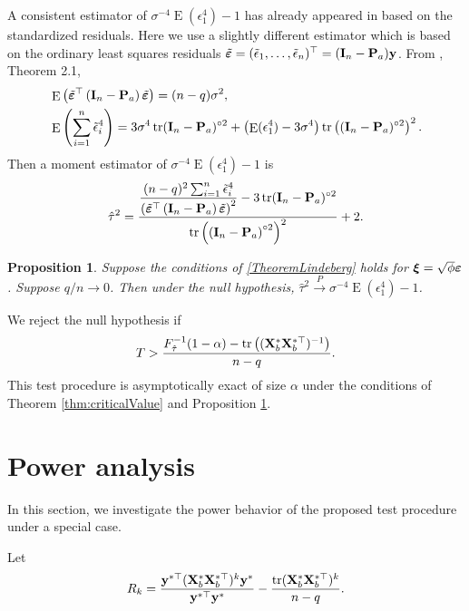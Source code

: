 \documentclass[11pt]{article}
\DeclareMathOperator{\mytr}{tr}
\DeclareMathOperator{\myE}{E}
\newcommand{\By}{\mathbf{y}}    \newcommand{\Bz}{\mathbf{z}}
\newcommand{\bfsym}[1]{\ensuremath{\boldsymbol{#1}}}
\def\bxi{\bfsym {\xi}}
\theoremstyle{plain}
\newtheorem{proposition}{\quad\quad Proposition}
\theoremstyle{definition}
\theoremstyle{remark}
\begin{document}
        A consistent estimator of $\sigma^{-4} \myE (\epsilon_1^4)-1$ has already appeared in \cite{Bai2017} based on the standardized residuals.
        Here we use a slightly different estimator which is based on the ordinary least squares residuals $\tilde \bepsilon=(\tilde \epsilon_1,\ldots, \tilde \epsilon_n)^\top=(\BI_n - \BP_a) \By$.
    From \cite{Bai2017}, Theorem 2.1, 
    \begin{align*}
        &\myE \left( \tilde \bepsilon^\top \left( \BI_n-\BP_a \right) \tilde \bepsilon \right)
        = (n-q) \sigma^2,
        \\
        &\myE \left( \sum_{i=1}^n \tilde \epsilon_i^4 \right)
        =
        3\sigma^4 \mytr (\BI_n-\BP_a)^{\circ 2} 
        +\left( \myE (\epsilon_1^4)-3 \sigma^{4}\right)
        \mytr \left( (\BI_n-\BP_a)^{\circ 2}  \right)^2.
    \end{align*}
    Then a moment estimator of $\sigma^{-4}\myE (\epsilon_1^4)-1$ is 
\begin{equation*}
    \hat \tau^2 =
    \frac{
        \displaystyle\frac{(n-q)^2 \sum_{i=1}^n \tilde{\epsilon}_i^4}{\left( \tilde \bepsilon^\top \left( \BI_n - \BP_a \right) \tilde \bepsilon \right)^2}
        - 3\mytr (\BI_n-\BP_a)^{\circ 2}
    }{
        \mytr\left( \left( \BI_n-\BP_a \right)^{\circ 2} \right)^2
    }
    +2.
\end{equation*}

\begin{proposition}\label{prop:estimation}
    Suppose the conditions of \ref{TheoremLindeberg} holds for $\bxi=\sqrt \phi \bepsilon$.
    Suppose $q/n\to 0$.
    Then under the null hypothesis, $\hat \tau^2 \xrightarrow{P} \sigma^{-4} \myE (\epsilon_1^4)-1$.
\end{proposition}
We reject the null hypothesis if 
\begin{equation*}
    T > \frac{F^{-1}_{\hat \tau} (1-\alpha)-\mytr\left( (\BX_b^* \BX_b^{*\top})^{-1}  \right)}{n-q}.
\end{equation*}
This test procedure is asymptotically exact of size $\alpha$ under the conditions of Theorem \ref{thm:criticalValue} and Proposition \ref{prop:estimation}.


\section{Power analysis}
In this section, we investigate the power behavior of the proposed test procedure under a special case.

Let
\begin{equation*}
    R_k=
    \frac{
\By^{*\top}
    (\BX_b^* \BX_b^{*\top})^{k} 
        \By^*
    }{\By^{*\top} \By^*}
-
\frac{\mytr  (\BX_b^* \BX_b^{*\top})^{k}}{n-q}.
\end{equation*}
\end{document}

